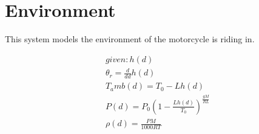 \documentclass[../SimBALink.tex]{subfiles}
\begin{document}
\section{Environment} This system models the environment of the motorcycle is riding in.

\begin{gather}
given: h(d) \\
\theta_r  = \frac{d}{dd} h(d) \\
T_amb(d) = T_0 - L h(d) \\
P(d) = P_0 \left( 1 - \frac{L h(d)}{T_0} \right)^{\frac{gM}{RL}}\\
\rho(d) = \frac{PM}{1000RT}  
\end{gather}
\end{document}
